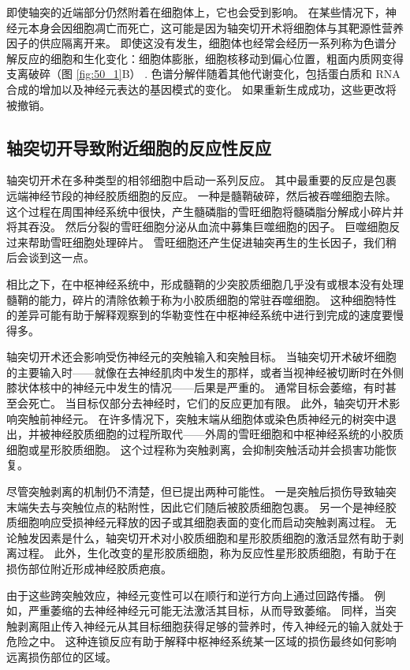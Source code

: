 即使轴突的近端部分仍然附着在细胞体上，它也会受到影响。 在某些情况下，神经元本身会因细胞凋亡而死亡，这可能是因为轴突切开术将细胞体与其靶源性营养因子的供应隔离开来。 即使这没有发生，细胞体也经常会经历一系列称为色谱分解反应的细胞和生化变化：细胞体膨胀，细胞核移动到偏心位置，粗面内质网变得支离破碎（图 \ref{fig:50_1}B） . 色谱分解伴随着其他代谢变化，包括蛋白质和 RNA 合成的增加以及神经元表达的基因模式的变化。 如果重新生成成功，这些更改将被撤销。

\subsection{轴突切开导致附近细胞的反应性反应}

轴突切开术在多种类型的相邻细胞中启动一系列反应。 其中最重要的反应是包裹远端神经节段的神经胶质细胞的反应。 一种是髓鞘破碎，然后被吞噬细胞去除。 这个过程在周围神经系统中很快，产生髓磷脂的雪旺细胞将髓磷脂分解成小碎片并将其吞没。 然后分裂的雪旺细胞分泌从血流中募集巨噬细胞的因子。 巨噬细胞反过来帮助雪旺细胞处理碎片。 雪旺细胞还产生促进轴突再生的生长因子，我们稍后会谈到这一点。

相比之下，在中枢神经系统中，形成髓鞘的少突胶质细胞几乎没有或根本没有处理髓鞘的能力，碎片的清除依赖于称为小胶质细胞的常驻吞噬细胞。 这种细胞特性的差异可能有助于解释观察到的华勒变性在中枢神经系统中进行到完成的速度要慢得多。

轴突切开术还会影响受伤神经元的突触输入和突触目标。 当轴突切开术破坏细胞的主要输入时——就像在去神经肌肉中发生的那样，或者当视神经被切断时在外侧膝状体核中的神经元中发生的情况——后果是严重的。 通常目标会萎缩，有时甚至会死亡。 当目标仅部分去神经时，它们的反应更加有限。 此外，轴突切开术影响突触前神经元。 在许多情况下，突触末端从细胞体或染色质神经元的树突中退出，并被神经胶质细胞的过程所取代——外周的雪旺细胞和中枢神经系统的小胶质细胞或星形胶质细胞。 这个过程称为突触剥离，会抑制突触活动并会损害功能恢复。

尽管突触剥离的机制仍不清楚，但已提出两种可能性。 一是突触后损伤导致轴突末端失去与突触位点的粘附性，因此它们随后被胶质细胞包裹。 另一个是神经胶质细胞响应受损神经元释放的因子或其细胞表面的变化而启动突触剥离过程。 无论触发因素是什么，轴突切开术对小胶质细胞和星形胶质细胞的激活显然有助于剥离过程。 此外，生化改变的星形胶质细胞，称为反应性星形胶质细胞，有助于在损伤部位附近形成神经胶质疤痕。

由于这些跨突触效应，神经元变性可以在顺行和逆行方向上通过回路传播。 例如，严重萎缩的去神经神经元可能无法激活其目标，从而导致萎缩。 同样，当突触剥离阻止传入神经元从其目标细胞获得足够的营养时，传入神经元的输入就处于危险之中。 这种连锁反应有助于解释中枢神经系统某一区域的损伤最终如何影响远离损伤部位的区域。

